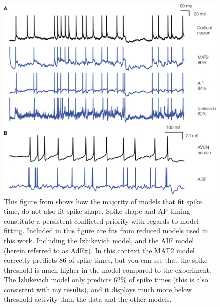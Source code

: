 \begin{figure}
    \centering
    \includegraphics[scale=5.0]{figures/IZHIkevich_fit_60Adexp_80.jpg}
    \caption[Model Fits in Prior Work]{This figure from  \cite{rossant2011fitting} shows how the majority of models that fit spike time, do not also fit spike shape. Spike shape and AP timing constitute a persistent conflicted priority with regards to model fitting. Included in this figure are fits from reduced models used in this work. Including the Izhikevich model, and the AIF model (herein referred to as AdEx). In this  context the MAT2 model correctly predicts $86$ of spike times, but you can see that the spike threshold is much higher in the model compared to the experiment. The Izhikevich model only predicts $62\%$ of spike times (this is also consistent with my results), and it displays much more below threshold activity than the data and the other models.} 
    \label{fig:rossant-fits}
\end{figure}

